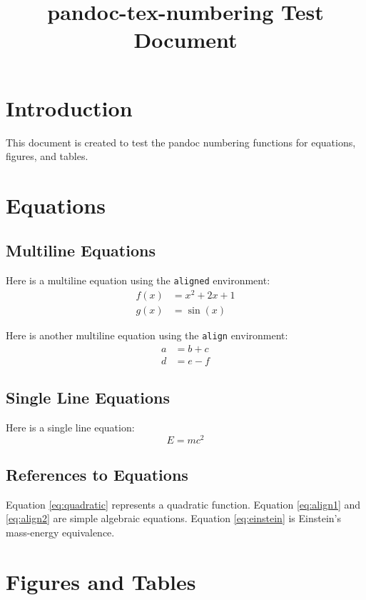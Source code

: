 \documentclass{article}
\title{pandoc-tex-numbering Test Document}
\begin{document}
\maketitle
\section{Introduction}
This document is created to test the pandoc numbering functions for equations, figures, and tables.

\section{Equations}
\subsection{Multiline Equations}
Here is a multiline equation using the \texttt{aligned} environment:
\begin{equation}
    \begin{aligned}
        f(x) &= x^2 + 2x + 1 \\
        g(x) &= \sin(x)
    \end{aligned}
    \label{eq:quadratic}
\end{equation}

Here is another multiline equation using the \texttt{align} environment:
\begin{align}
    a &= b + c \label{eq:align1} \\
    d &= e - f \label{eq:align2}
\end{align}

\subsection{Single Line Equations}
Here is a single line equation:
\begin{equation}
    E = mc^2 \label{eq:einstein}
\end{equation}

\subsection{References to Equations}
Equation \ref{eq:quadratic} represents a quadratic function. Equation \ref{eq:align1} and \ref{eq:align2} are simple algebraic equations. Equation \ref{eq:einstein} is Einstein's mass-energy equivalence.

\section{Figures and Tables}
\end{document}
